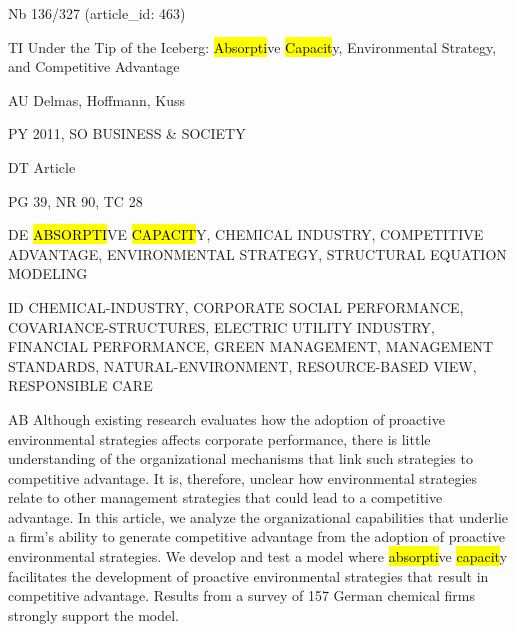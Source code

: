 \documentclass[a4paper]{article}
\begin{document}
\vspace*{-2cm}
Nb \tabto{0cm}136/327 (article\_id: 463)\par
TI \tabto{0cm}Under the Tip of the Iceberg: \hl{Absorpti}ve \hl{Capacit}y, Environmental Strategy, and Competitive Advantage\par
AU \tabto{0cm}Delmas, Hoffmann, Kuss\par
PY \tabto{0cm}2011, SO BUSINESS \& SOCIETY\par
DT \tabto{0cm}Article\par
PG \tabto{0cm}39, NR 90, TC 28\par
DE \tabto{0cm}\hl{ABSORPTI}VE \hl{CAPACIT}Y, CHEMICAL INDUSTRY, COMPETITIVE ADVANTAGE, ENVIRONMENTAL STRATEGY, STRUCTURAL EQUATION MODELING\par
ID \tabto{0cm}CHEMICAL-INDUSTRY, CORPORATE SOCIAL PERFORMANCE, COVARIANCE-STRUCTURES, ELECTRIC UTILITY INDUSTRY, FINANCIAL PERFORMANCE, GREEN MANAGEMENT, MANAGEMENT STANDARDS, NATURAL-ENVIRONMENT, RESOURCE-BASED VIEW, RESPONSIBLE CARE\par
AB \tabto{0cm}Although existing research evaluates how the adoption of proactive environmental strategies affects corporate performance, there is little understanding of the organizational mechanisms that link such strategies to competitive advantage. It is, therefore, unclear how environmental strategies relate to other management strategies that could lead to a competitive advantage. In this article, we analyze the organizational capabilities that underlie a firm's ability to generate competitive advantage from the adoption of proactive environmental strategies. We develop and test a model where \hl{absorpti}ve \hl{capacit}y facilitates the development of proactive environmental strategies that result in competitive advantage. Results from a survey of 157 German chemical firms strongly support the model.\par
\clearpage
\end{document}
